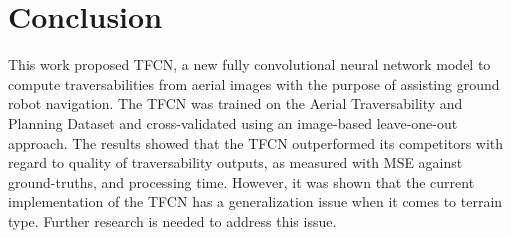 \documentclass[conference]{IEEEtran}
\begin{document}
\section{Conclusion}
\label{section:conclusion}

This work proposed TFCN, a new fully convolutional neural network model to compute traversabilities from aerial images with the purpose of assisting ground robot navigation.
The TFCN was trained on the Aerial Traversability and Planning Dataset and cross-validated using an image-based leave-one-out approach.
The results showed that the TFCN outperformed its competitors with regard to quality of traversability outputs, as measured with MSE against ground-truths, and processing time.
However, it was shown that the current implementation of the TFCN has a generalization issue when it comes to terrain type.
Further research is needed to address this issue.




\end{document}

